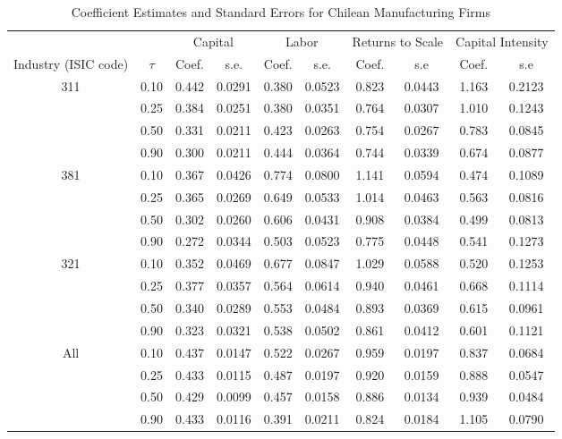 \begin{table}[ht]
\centering
\caption{Coefficient Estimates and Standard Errors for Chilean Manufacturing Firms} 
\begin{tabular}{cccccccccc}
  \hline\hline & & \multicolumn{2}{c}{Capital}  & \multicolumn{2}{c}{Labor} & \multicolumn{2}{c}{Returns to Scale} & \multicolumn{2}{c}{Capital Intensity}\\ \cmidrule(lr){3-4} \cmidrule(lr){5-6} \cmidrule(lr){7-8} \cmidrule(lr){9-10}Industry (ISIC code) & $\tau$ & Coef. & s.e. & Coef. & s.e. & Coef. & s.e & Coef. & s.e \\ 
  \hline
311 & 0.10 & 0.442 & 0.0291 & 0.380 & 0.0523 & 0.823 & 0.0443 & 1.163 & 0.2123 \\ 
   & 0.25 & 0.384 & 0.0251 & 0.380 & 0.0351 & 0.764 & 0.0307 & 1.010 & 0.1243 \\ 
   & 0.50 & 0.331 & 0.0211 & 0.423 & 0.0263 & 0.754 & 0.0267 & 0.783 & 0.0845 \\ 
   & 0.90 & 0.300 & 0.0211 & 0.444 & 0.0364 & 0.744 & 0.0339 & 0.674 & 0.0877 \\ 
  381 & 0.10 & 0.367 & 0.0426 & 0.774 & 0.0800 & 1.141 & 0.0594 & 0.474 & 0.1089 \\ 
   & 0.25 & 0.365 & 0.0269 & 0.649 & 0.0533 & 1.014 & 0.0463 & 0.563 & 0.0816 \\ 
   & 0.50 & 0.302 & 0.0260 & 0.606 & 0.0431 & 0.908 & 0.0384 & 0.499 & 0.0813 \\ 
   & 0.90 & 0.272 & 0.0344 & 0.503 & 0.0523 & 0.775 & 0.0448 & 0.541 & 0.1273 \\ 
  321 & 0.10 & 0.352 & 0.0469 & 0.677 & 0.0847 & 1.029 & 0.0588 & 0.520 & 0.1253 \\ 
   & 0.25 & 0.377 & 0.0357 & 0.564 & 0.0614 & 0.940 & 0.0461 & 0.668 & 0.1114 \\ 
   & 0.50 & 0.340 & 0.0289 & 0.553 & 0.0484 & 0.893 & 0.0369 & 0.615 & 0.0961 \\ 
   & 0.90 & 0.323 & 0.0321 & 0.538 & 0.0502 & 0.861 & 0.0412 & 0.601 & 0.1121 \\ 
  All & 0.10 & 0.437 & 0.0147 & 0.522 & 0.0267 & 0.959 & 0.0197 & 0.837 & 0.0684 \\ 
   & 0.25 & 0.433 & 0.0115 & 0.487 & 0.0197 & 0.920 & 0.0159 & 0.888 & 0.0547 \\ 
   & 0.50 & 0.429 & 0.0099 & 0.457 & 0.0158 & 0.886 & 0.0134 & 0.939 & 0.0484 \\ 
   & 0.90 & 0.433 & 0.0116 & 0.391 & 0.0211 & 0.824 & 0.0184 & 1.105 & 0.0790 \\ 
   \hline
\end{tabular}
\end{table}
